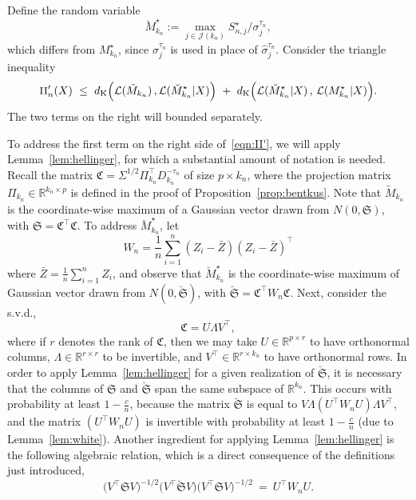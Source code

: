\documentclass[aos,preprint]{imsart}
\numberwithin{equation}{section}
\theoremstyle{plain}
\newcommand{\R}{\mathbb{R}}
\renewcommand{\hat}[1]{\widehat{#1}}
\newcommand{\II}{\textsc{II}}
\newcommand{\dK}{d_{\textup{K}}}
\newcommand{\J}{\mathcal{J}}
\renewcommand{\L}{\mathcal{L}}
\newcommand{\ttop}{^{\top}}
\newcommand{\ts}{\textstyle}
\newcommand{\1}{{\bf{1}}}
\newcommand{\0}{\mathbf{0}}
\begin{document}
\proof Define the random variable
\begin{equation}
\breve M_{k_n}^{\star}:=\max_{j\in \J(k_n)} S_{n,j}^{\star}/\sigma_j^{\tau_n},
\end{equation}
which differs from $M_{k_n}^{\star}$, since $\sigma_j^{\tau_n}$ is used in place of $\hat\sigma_j^{\tau_n}$.
 Consider the triangle inequality
 \begin{equation}\label{eqn:II'}
 \small
\II_n'(X) \ \leq \ \dK\Big(\L(\tilde M_{k_n})\, , \L(\breve M_{k_n}^{\star}|X)\Big) \ + \ \dK \Big(\L(\breve M_{k_n}^{\star}|X) \, , \, \L(M_{k_n}^{\star}|X)\Big).
\end{equation}
%
The two terms on the right will bounded separately. 

To address the first term on the right side of~\eqref{eqn:II'}, we will apply Lemma~\ref{lem:hellinger}, for which a substantial amount of notation is needed. Recall the matrix $\mathfrak{C}=\Sigma^{1/2}\Pi_{k_n}\ttop D_{k_n}^{-\tau_n}$ of size $p\times k_n$, where the projection matrix $\Pi_{k_n}\in\R^{k_n\times p}$ is defined in the proof of Proposition~\ref{prop:bentkus}.  Note that $\tilde M_{k_n}$ is the coordinate-wise maximum of a Gaussian vector drawn from $N(0,\mathfrak{S})$, with $\mathfrak{S}=\mathfrak{C}\ttop\mathfrak{C}$. To address $\breve{M}_{k_n}^{\star}$, let
$$W_n=\ts\frac 1n \sum_{i=1}^n  (Z_i-\bar Z)(Z_i-\bar Z)\ttop$$ 
where $\bar Z=\frac 1n \sum_{i=1}^n Z_i$, and observe that $\breve{M}_{k_n}^{\star}$ is the coordinate-wise maximum of Gaussian vector drawn from $N(0,\breve{\mathfrak{S}})$, with $\breve{\mathfrak{S}}=\mathfrak{C}\ttop W_n\mathfrak{C}$. Next, consider the s.v.d.,
$$\mathfrak{C}=U\Lambda V\ttop,$$
where if $r$ denotes the rank of $\mathfrak{C}$, then we may take $U\in\R^{p\times r}$ to have orthonormal columns, $\Lambda\in\R^{r\times r}$ to be invertible, and $V\ttop\in\R^{r\times k_n}$ to have orthonormal rows. In order to apply Lemma~\ref{lem:hellinger} for a given realization of $\breve{\mathfrak{S}}$, it is necessary that the columns of $\mathfrak{S}$ and $\breve{\mathfrak{S}}$ span the same subspace of $\R^{k_n}$. This occurs with probability at least $1-\frac cn$, because the matrix $\breve{\mathfrak{S}}$ is equal to $V\Lambda (U\ttop W_n U)\Lambda V\ttop$, and the matrix $(U\ttop W_n U)$ is invertible with probability at least $1-\frac cn$ (due to Lemma~\ref{lem:white}). Another ingredient for applying Lemma~\ref{lem:hellinger} is the following algebraic relation, which is a direct consequence of the definitions just introduced,
\begin{equation}
\Big(V\ttop \mathfrak{S} V\Big)^{-1/2}\Big( V\ttop \breve{\mathfrak{S}}V\Big) \Big(V\ttop\mathfrak{S}V\Big)^{-1/2} \ = \ U\ttop W_n U.
\end{equation}
\end{document}
